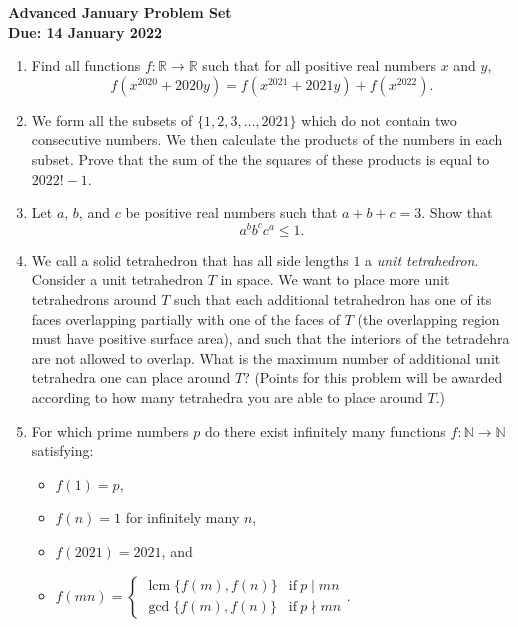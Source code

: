 \documentclass{article}
\DeclareMathOperator{\lcm}{lcm}
\begin{document}
\thispagestyle{empty}

\begin{center}
  \textbf{\Large Advanced January Problem Set}
  \\ \vspace{1em}
  \textbf{\large Due: 14 January 2022}
\end{center}

\bigskip

\begin{enumerate}[itemsep=\fill]

\item %
Find all functions $f : \mathbb{R} \to \mathbb{R}$ such that for all positive real numbers $x$ and $y$,
\[ f(x^{2020} +2020y) = f(x^{2021} +2021y) +f(x^{2022}).\]


\item %
We form all the subsets of $\{1, 2, 3, \dotsc, 2021\}$ which do not contain two consecutive numbers.
We then calculate the products of the numbers in each subset.
Prove that the sum of the the squares of these products is equal to $2022! -1$.


\item %
Let $a$, $b$, and $c$ be positive real numbers such that $a+b+c = 3$.
Show that
\[ a^b b^c c^a \leq 1. \]


\item %
We call a solid tetrahedron that has all side lengths $1$ a \emph{unit tetrahedron}.
Consider a unit tetrahedron $T$ in space.
We want to place more unit tetrahedrons around $T$ such that each additional tetrahedron has one of its faces overlapping partially with one of the faces of $T$ (the overlapping region must have positive surface area), and such that the interiors of the tetradehra are not allowed to overlap.
What is the maximum number of additional unit tetrahedra one can place around $T$?
(Points for this problem will be awarded according to how many tetrahedra you are able to place around $T$.)


\item %
For which prime numbers $p$ do there exist infinitely many functions $f : \mathbb{N} \to \mathbb{N}$ satisfying:
\begin{itemize}[twocol]
	\item $f(1) = p$,
	\item $f(n) = 1$ for infinitely many $n$,
	\item $f(2021) = 2021$, and
	\item $f(mn) = \begin{cases}
		\lcm\{f(m),f(n)\} & \text{if}\ p \mid mn \\
		\gcd\{f(m),f(n)\} & \text{if}\ p \nmid mn
	\end{cases}$.
\end{itemize}



\end{enumerate}
\end{document}
